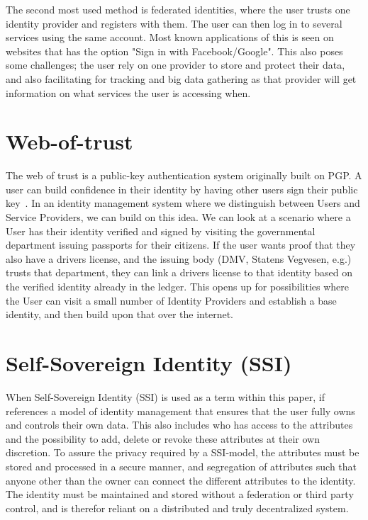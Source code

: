 The second most used method is federated identities, where the user trusts one identity provider and registers with them. The user can then log in to several services using the same account. Most known applications of this is seen on websites that has the option "Sign in with Facebook/Google". This also poses some challenges; the user rely on one provider to store and protect their data, and also facilitating for tracking and big data gathering as that provider will get information on what services the user is accessing when.

\section{Web-of-trust}
The web of trust is a public-key authentication system originally built on PGP. A user can build confidence in their identity by having other users sign their public key~\cite{Azouvi2017}. In an identity management system where we distinguish between Users and Service Providers, we can build on this idea. We can look at a scenario where a User has their identity verified and signed by visiting the governmental department issuing passports for their citizens. If the user wants proof that they also have a drivers license, and the issuing body (DMV, Statens Vegvesen, e.g.) trusts that department, they can link a drivers license to that identity based on the verified identity already in the ledger. This opens up for possibilities where the User can visit a small number of Identity Providers and establish a base identity, and then build upon that over the internet.


\section{Self-Sovereign Identity (SSI)}
When Self-Sovereign Identity (SSI) is used as a term within this paper, if references a model of identity management that ensures that the user fully owns and controls their own data. This also includes who has access to the attributes and the possibility to add, delete or revoke these attributes at their own discretion. To assure the privacy required by a SSI-model, the attributes must be stored and processed in a secure manner, and segregation of attributes such that anyone other than the owner can connect the different attributes to the identity. The identity must be maintained and stored without a federation or third party control, and is therefor reliant on a distributed and truly decentralized system.

